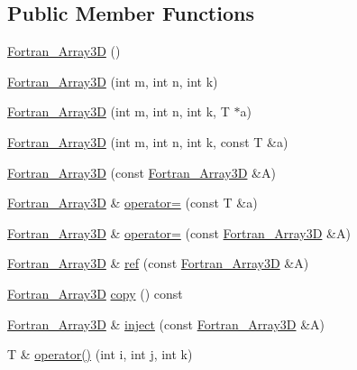 \subsection*{Public Member Functions}
\begin{DoxyCompactItemize}
\item 
\hyperlink{classTNT_1_1Fortran__Array3D_a21a80db962738ae9b44f900a67a12d9d}{Fortran\+\_\+\+Array3D} ()
\item 
\hyperlink{classTNT_1_1Fortran__Array3D_ae21aebe248a70f8aebb02019ca234018}{Fortran\+\_\+\+Array3D} (int m, int n, int k)
\item 
\hyperlink{classTNT_1_1Fortran__Array3D_afc769243d26ea77ee409b50b61ae8e6a}{Fortran\+\_\+\+Array3D} (int m, int n, int k, T $\ast$a)
\item 
\hyperlink{classTNT_1_1Fortran__Array3D_af2ef9c1ce37546da4f2e63ec2ac33537}{Fortran\+\_\+\+Array3D} (int m, int n, int k, const T \&a)
\item 
\hyperlink{classTNT_1_1Fortran__Array3D_a80a98d39df23c4b3a59c7952387c07c8}{Fortran\+\_\+\+Array3D} (const \hyperlink{classTNT_1_1Fortran__Array3D}{Fortran\+\_\+\+Array3D} \&A)
\item 
\hyperlink{classTNT_1_1Fortran__Array3D}{Fortran\+\_\+\+Array3D} \& \hyperlink{classTNT_1_1Fortran__Array3D_afb4adfeb473778f57769bca704245aa5}{operator=} (const T \&a)
\item 
\hyperlink{classTNT_1_1Fortran__Array3D}{Fortran\+\_\+\+Array3D} \& \hyperlink{classTNT_1_1Fortran__Array3D_a64f8785f3d81e07cb2df6e1bd7eefde5}{operator=} (const \hyperlink{classTNT_1_1Fortran__Array3D}{Fortran\+\_\+\+Array3D} \&A)
\item 
\hyperlink{classTNT_1_1Fortran__Array3D}{Fortran\+\_\+\+Array3D} \& \hyperlink{classTNT_1_1Fortran__Array3D_a344143d5f036e6bc72d111b83b577ed5}{ref} (const \hyperlink{classTNT_1_1Fortran__Array3D}{Fortran\+\_\+\+Array3D} \&A)
\item 
\hyperlink{classTNT_1_1Fortran__Array3D}{Fortran\+\_\+\+Array3D} \hyperlink{classTNT_1_1Fortran__Array3D_a8c611d5f5c178ba17716bc55f4d6ef0e}{copy} () const
\item 
\hyperlink{classTNT_1_1Fortran__Array3D}{Fortran\+\_\+\+Array3D} \& \hyperlink{classTNT_1_1Fortran__Array3D_aa2b78e3242a7506843c10642fc289ce1}{inject} (const \hyperlink{classTNT_1_1Fortran__Array3D}{Fortran\+\_\+\+Array3D} \&A)
\item 
T \& \hyperlink{classTNT_1_1Fortran__Array3D_a18c12002351d9b7ef7cd1b483ebb1c9f}{operator()} (int i, int j, int k)
\item 

\end{DoxyCompactItemize}
